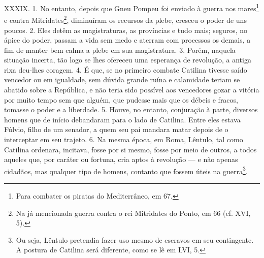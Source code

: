 XXXIX. 1. No entanto, depois que Gneu Pompeu foi enviado à guerra nos
mares\footnote{Para combater os piratas do Mediterrâneo, em 67.} e contra
Mitridates\footnote{Na já mencionada guerra contra o rei Mitridates do Ponto,
em 66 (cf. XVI, 5).}, diminuíram os recursos da plebe, cresceu o poder de uns
poucos. 2. Eles detêm as magistraturas, as províncias e tudo mais; seguros, no
ápice do poder, passam a vida sem medo e aterram com processos os demais, a fim
de manter bem calma a plebe em sua magistratura. 3. Porém, naquela situação
incerta, tão logo se lhes ofereceu uma esperança de revolução, a antiga rixa
deu-lhes coragem. 4. É que, se no primeiro combate Catilina tivesse saído vencedor ou
em igualdade, sem dúvida grande ruína e calamidade teriam se abatido sobre a
República, e não teria sido possível aos vencedores gozar a vitória por muito tempo
sem que alguém, que pudesse mais que os débeis e fracos, tomasse o poder e a
liberdade. 5. Houve, no entanto, conjuração à parte, diversos homens que de
início debandaram para o lado de Catilina. Entre eles estava Fúlvio, filho de
um senador, a quem seu pai mandara matar depois de o interceptar em seu
trajeto. 6. Na mesma época, em Roma, Lêntulo, tal como Catilina ordenara,
incitava, fosse por si mesmo, fosse por meio de outros, a todos aqueles que,
por caráter ou fortuna, cria aptos à revolução --- e não apenas cidadãos, mas
qualquer tipo de homens, contanto que fossem úteis na guerra\footnote{Ou seja,
Lêntulo pretendia fazer uso mesmo de escravos em seu contingente. A postura de
Catilina será diferente, como se lê em LVI, 5.}. 

